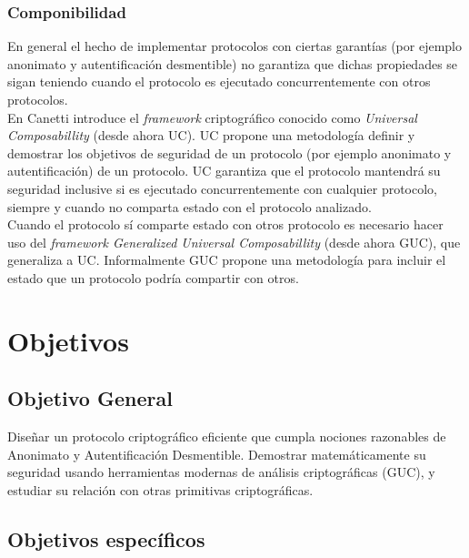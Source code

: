 \subsubsection{Componibilidad}
En general el hecho de implementar protocolos con ciertas garantías (por ejemplo anonimato y
autentificación desmentible) no garantiza que dichas propiedades se sigan teniendo cuando
el protocolo es ejecutado concurrentemente con otros protocolos.\\
En \cite{conf/focs/Canetti01} Canetti introduce el \textit{framework} criptográfico conocido
como \textit{Universal Composabillity} (desde ahora UC). UC propone una metodología definir y
demostrar los objetivos de seguridad de un protocolo (por ejemplo anonimato y autentificación)
de un protocolo. UC garantiza que el protocolo mantendrá su seguridad inclusive
si es ejecutado concurrentemente con cualquier protocolo, siempre y cuando no comparta estado
con el protocolo analizado.\\
Cuando el protocolo sí comparte estado con otros protocolo es necesario hacer uso del
\textit{framework Generalized Universal Composabillity} (desde ahora GUC), que generaliza a UC.
Informalmente GUC propone una metodología para incluir el estado que un protocolo podría compartir
con otros.

\section{Objetivos}

\subsection{Objetivo General}
Diseñar un protocolo criptográfico eficiente que cumpla nociones razonables
de Anonimato y Autentificación Desmentible. Demostrar matemáticamente su
seguridad usando herramientas modernas de análisis criptográficas (GUC), y
estudiar su relación con otras primitivas criptográficas.

\subsection{Objetivos específicos}

